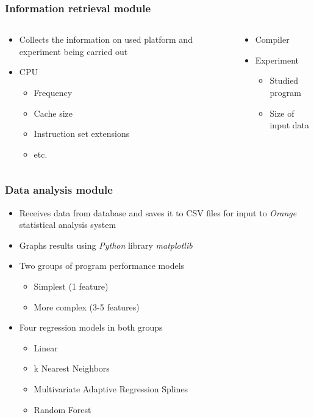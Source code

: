 \documentclass{beamer}
\begin{document}
\begin{frame}
\frametitle{Information retrieval module}

	\begin{columns}[T]
		\begin{column}{0.5\textwidth}
			\begin{itemize}
				\item Collects the information on used platform and experiment being carried out
				\item CPU
				\begin{itemize}
					\item Frequency
					\item Cache size
					\item Instruction set extensions
					\item etc.
				\end{itemize}

			\end{itemize}
		\end{column}
		\begin{column}{0.5\textwidth}
			\begin{itemize}
				\item Compiler
				\item Experiment
				\begin{itemize}
					\item Studied program
					\item Size of input data
				\end{itemize}
			\end{itemize}
		\end{column}
	\end{columns}
	
\end{frame}

\begin{frame}
\frametitle{Data analysis module}

\begin{itemize}
	\item Receives data from database and saves it to CSV files for input to \textit{Orange} statistical analysis system
	\item Graphs results using \textit{Python} library \textit{matplotlib}
	\item Two groups of program performance models
	\begin{itemize}
		\item Simplest (1 feature)
		\item More complex (3-5 features)
	\end{itemize}
	\item Four regression models in both groups
	\begin{itemize}
		\item Linear
		\item k Nearest Neighbors
		\item Multivariate Adaptive Regression Splines
		\item Random Forest
	\end{itemize}
\end{itemize}

\end{frame}
\end{document}

